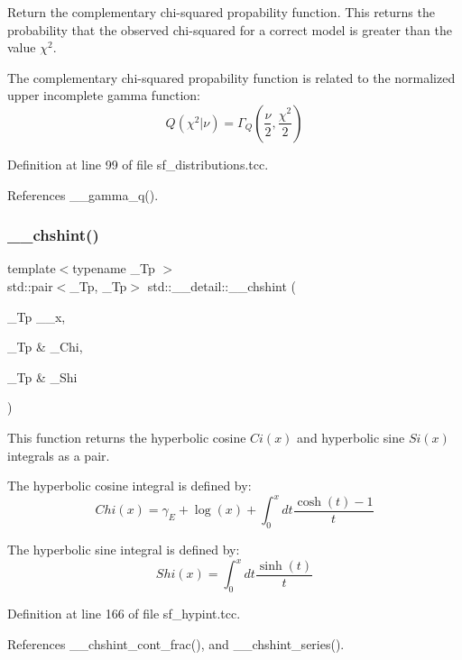 Return the complementary chi-\/squared propability function. This returns the probability that the observed chi-\/squared for a correct model is greater than the value $ \chi^2 $. 

The complementary chi-\/squared propability function is related to the normalized upper incomplete gamma function\+: \[ Q(\chi^2|\nu) = \Gamma_Q(\frac{\nu}{2}, \frac{\chi^2}{2}) \] 

Definition at line 99 of file sf\+\_\+distributions.\+tcc.



References \+\_\+\+\_\+gamma\+\_\+q().

\mbox{\label{namespacestd_1_1____detail_aa07abc4dac6cf589ccd12d3ce40277cf}} 
\subsubsection{\texorpdfstring{\+\_\+\+\_\+chshint()}{\_\_chshint()}}
{\footnotesize\ttfamily template$<$typename \+\_\+\+Tp $>$ \\
std\+::pair$<$\+\_\+\+Tp, \+\_\+\+Tp$>$ std\+::\+\_\+\+\_\+detail\+::\+\_\+\+\_\+chshint (\begin{DoxyParamCaption}\item[{\+\_\+\+Tp}]{\+\_\+\+\_\+x,  }\item[{\+\_\+\+Tp \&}]{\+\_\+\+Chi,  }\item[{\+\_\+\+Tp \&}]{\+\_\+\+Shi }\end{DoxyParamCaption})}



This function returns the hyperbolic cosine $ Ci(x) $ and hyperbolic sine $ Si(x) $ integrals as a pair. 

The hyperbolic cosine integral is defined by\+: \[ Chi(x) = \gamma_E + \log(x) + \int_0^x dt \frac{\cosh(t) - 1}{t} \]

The hyperbolic sine integral is defined by\+: \[ Shi(x) = \int_0^x dt \frac{\sinh(t)}{t} \] 

Definition at line 166 of file sf\+\_\+hypint.\+tcc.



References \+\_\+\+\_\+chshint\+\_\+cont\+\_\+frac(), and \+\_\+\+\_\+chshint\+\_\+series().

